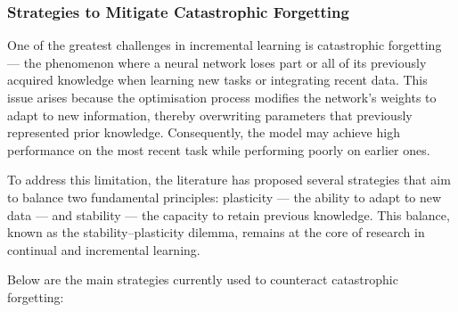 \subsubsection{Strategies to Mitigate Catastrophic Forgetting}

One of the greatest challenges in incremental learning is catastrophic forgetting — the phenomenon where a neural network loses part or all of its previously acquired knowledge when learning new tasks or integrating recent data.  
This issue arises because the optimisation process modifies the network’s weights to adapt to new information, thereby overwriting parameters that previously represented prior knowledge.  
Consequently, the model may achieve high performance on the most recent task while performing poorly on earlier ones.

To address this limitation, the literature has proposed several strategies that aim to balance two fundamental principles: plasticity — the ability to adapt to new data — and stability — the capacity to retain previous knowledge.  
This balance, known as the stability–plasticity dilemma, remains at the core of research in continual and incremental learning.

Below are the main strategies currently used to counteract catastrophic forgetting:

